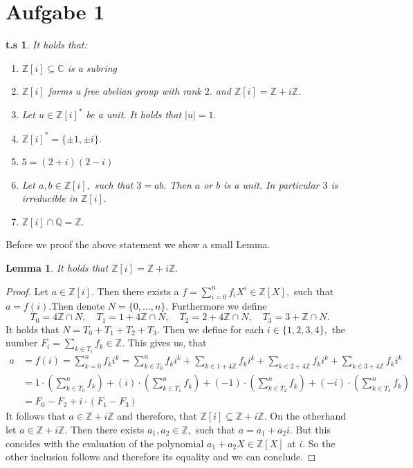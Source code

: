 \documentclass[10pt,a4paper]{article}
\date{\today}
\newtheorem*{zz*}{t.s}
\newtheorem*{lemma*}{Lemma}
\newcommand{\CC}{\mathbb{C}}
\newcommand{\QQ}{\mathbb{Q}}
\newcommand{\ZZ}{\mathbb{Z}}
\begin{document}
	
	\section*{Aufgabe 1}
	\begin{zz*}
		It holds that:
		\begin{enumerate}[label = (\roman*)]
			\item $\ZZ[i]\subseteq \CC$ is a subring
			\item $\ZZ[i]$ forms a free abelian group with rank $2.$ and $\ZZ[i] = \ZZ+i\ZZ.$
			\item Let $u\in \ZZ[i]^*$ be a unit. It holds that $|u| = 1.$
			\item $\ZZ[i]^* = \{\pm1,\pm i\}.$
			\item $5 = (2+i)(2-i)$
			\item Let $a,b\in \ZZ[i],$ such that $3 = ab.$ Then $a$ or $b$ is a unit. In particular $3$ is irreducible in $\ZZ[i].$
			\item $\ZZ[i]\cap \QQ = \ZZ.$
		\end{enumerate}
	\end{zz*}
	Before we proof the above statement we show a small Lemma.
	\begin{lemma*}
		It holds that $\ZZ[i] = \ZZ+i\ZZ.$
	\end{lemma*}
	\begin{proof}
		Let $a\in\ZZ[i].$ Then there exists a $f = \sum_{i=0}^nf_iX^i\in\ZZ[X],$ such that $a = f(i).$Then  denote $N = \{0,\dots, n\}.$ Furthermore we define 
		\[T_0 = 4\ZZ\cap N,\quad T_1 = 1+4\ZZ\cap N,\quad T_2 = 2+4\ZZ\cap N,\quad T_3 = 3+\ZZ\cap N. \]
		It holds that  $N = T_0 +T_1+T_2+T_3.$ Then we define for each $i\in \{1,2,3,4\},$ the number $F_i = \sum_{k\in T_i} f_k\in \ZZ.$ This gives us, that 
		\[\begin{split}
			a &= f(i) = \sum_{k=0}^nf_ki^k = \sum_{k\in T_0}^nf_ki^k + \sum_{k\in 1+4\ZZ} f_k i^k +\sum_{k\in 2+4\ZZ} f_k i^k + \sum_{k\in 3+4\ZZ} f_k i^k\\
			&= 1\cdot \left(\sum_{k\in T_0}^nf_k\right) + (i)\cdot \left(\sum_{k\in T_1}^nf_k\right) + (-1)\cdot \left(\sum_{k\in T_2}^nf_k\right) + (-i)\cdot \left(\sum_{k\in T_3}^nf_k\right)\\
			&= F_0-F_2 + i\cdot (F_1-F_3)
		\end{split}\]
		It follows that $a\in \ZZ+i\ZZ$ and therefore, that $\ZZ[i]\subseteq \ZZ+i\ZZ.$ On the otherhand let $a\in \ZZ + i\ZZ.$ Then there exists $a_1,a_2\in \ZZ,$ such that $a = a_1+a_2i.$ But this concides with the evaluation of the polynomial $a_1+a_2X\in \ZZ[X]$ at $i.$ So the other inclusion follows and therefore its equality and we can conclude.
	\end{proof}
\end{document}

